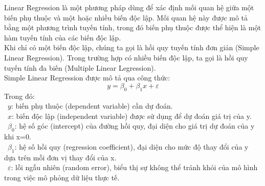 Linear Regression là một phương pháp dùng để xác định mối quan hệ giữa một biến phụ thuộc và một hoặc nhiều biến độc lập. Mối quan hệ này được mô tả bằng một phương trình tuyến tính, trong đó biến phụ thuộc được thể hiện là một hàm tuyến tính của các biến độc lập.\\
Khi chỉ có một biến độc lập, chúng ta gọi là hồi quy tuyến tính đơn giản (Simple Linear Regression). Trong trường hợp có nhiều biến độc lập, ta gọi là hồi quy tuyến tính đa biến (Multiple Linear Legression).\\
Simple Linear Regression được mô tả qua công thức:\\
\[
y=\beta_{0}+\beta_{1}x+\varepsilon
\]
Trong đó:\\
\indent\textbullet\ \(y\): biến phụ thuộc (dependent variable) cần dự đoán.\\
\indent\textbullet\ \(x\): biến độc lập (independent variable) được sử dụng để dự đoán giá trị của y.\\
\indent\textbullet\ \(\beta_{0}\): hệ số góc (intercept) của đường hồi quy, đại diện cho giá trị dự đoán của y khi x=0.\\
\indent\textbullet\ \(\beta_{1}\): hệ số hồi quy (regression coefficient), đại diện cho mức độ thay đổi của y dựa trên mỗi đơn vị thay đổi của x.\\
\indent\textbullet\ \(\varepsilon\): lỗi ngẫu nhiên (random error), biểu thị sự không thể tránh khỏi của mô hình trong việc mô phỏng dữ liệu thực tế.\\